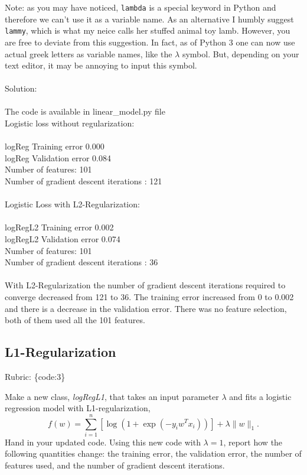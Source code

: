 \documentclass{article}
\def\rubric#1{\gre{Rubric: \{#1\}}}{}
\def\blu#1{{\color{blu}#1}}
\def\gre#1{{\color{gre}#1}}
\def\norm#1{\|#1\|}
\begin{document}
Note: as you may have noticed, \texttt{lambda} is a special keyword in Python and therefore we can't use it as a variable name.
As an alternative I humbly suggest \texttt{lammy}, which is what my neice calls her stuffed animal toy lamb.
However, you are free to deviate from this suggestion. In fact, as of Python 3 one can now use actual greek letters as variable names, like the $\lambda$ symbol. But, depending on your text editor, it may be annoying to input this symbol. \\ \\
\blu{Solution: \\ \\
The code is available in linear\_model.py file \\
Logistic loss without regularization: \\ \\
logReg Training error 0.000 \\
logReg Validation error 0.084 \\ 
Number of features: 101 \\ 
Number of gradient descent iterations : 121 \\ \\
Logistic Loss with L2-Regularization: \\ \\ 
logRegL2 Training error 0.002 \\
logRegL2 Validation error 0.074 \\
Number of features: 101 \\
Number of gradient descent iterations : 36 \\ \\
With L2-Regularization the number of gradient descent iterations required to converge decreased from 121 to 36. The training error increased from 0 to 0.002 and there is a decrease in the validation error. There was no feature selection, both of them used all the 101 features. 
}

\subsection{L1-Regularization}
\rubric{code:3}

Make a new class, \emph{logRegL1}, that takes an input parameter $\lambda$ and fits a logistic regression model with L1-regularization,
\[
f(w) = \sum_{i=1}^n \left[\log(1+\exp(-y_iw^Tx_i))\right] + \lambda\norm{w}_1.
\]
Hand in your updated code. Using this new code with $\lambda = 1$, report how the following quantities change: the training error, the validation error, the number of features used, and the number of gradient descent iterations.
\end{document}
